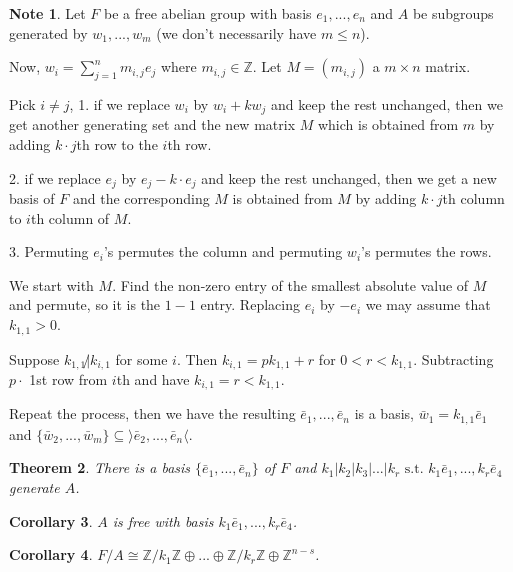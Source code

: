 \documentclass{amsart}
\newtheorem{thm}{Theorem}[section]
\newtheorem{cor}[thm]{Corollary}
\theoremstyle{definition}
\newtheorem{note}[thm]{Note}
\newcommand{\Z}{\mathbb Z}
\newcommand{\st}{\text{ s.t. }}
\begin{document}
\begin{note}
Let $F$ be a free abelian group with basis $e_1,...,e_n$ and $A$ be subgroups generated by $w_1,...,w_m$ (we don't necessarily have $m\leq n$).

Now, $w_i=\sum\limits_{j=1}^n m_{i,j}e_j$ where $m_{i,j}\in\Z$. Let $M=(m_{i,j})$ a $m\times n$ matrix.

Pick $i\not=j$, 1. if we replace $w_i$ by $w_i+kw_j$ and keep the rest unchanged, then we get another generating set and the new matrix $M$ which is obtained from $m$ by adding $k\cdot j$th row to the $i$th row.

2. if we replace $e_j$ by $e_j-k\cdot e_j$ and keep the rest unchanged, then we get a new basis of $F$ and the corresponding $M$ is obtained from $M$ by adding $k\cdot j$th column to $i$th column of $M$.

3. Permuting $e_i$'s permutes the column and permuting $w_i$'s permutes the rows.

We start with $M$. Find the non-zero entry of the smallest absolute value of $M$ and permute, so it is the $1-1$ entry. Replacing $e_i$ by $-e_i$ we may assume that $k_{1,1}>0$.

Suppose $k_{1,1}\not|k_{i,1}$ for some $i$. Then $k_{i,1}=pk_{1,1}+r$ for $0<r<k_{1,1}$. Subtracting $p\cdot$ 1st row from $i$th and have $k_{i,1}=r<k_{1,1}$.

Repeat the process, then we have the resulting $\bar e_1,...,\bar e_n$ is a basis, $\bar w_1=k_{1,1}\bar e_1$ and $\{\bar w_2,...,\bar w_m\}\subseteq \rangle \bar e_2,...,\bar e_n\langle$.	
\end{note}
\begin{thm}
There is a basis $\{\bar e_1,...,\bar e_n\}$ of $F$ and $k_1|k_2|k_3|...|k_r\st k_1\bar e_1, ...,k_r\bar e_4$ generate $A$.	
\end{thm}
\begin{cor}
$A$ is free with basis 	$k_1\bar e_1, ...,k_r\bar e_4$.
\end{cor}
\begin{cor}
$F/A\cong \Z/k_1\Z\oplus...\oplus \Z/k_r\Z\oplus \Z^{n-s}$.	
\end{cor}
\end{document}
